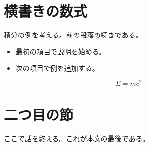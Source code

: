 \documentclass[a5paper]{ltjsarticle}
\begin{document}
\section{横書きの数式}
積分の例を考える。前の段落の続きである。

\begin{itemize}
\item 最初の項目で説明を始める。
\item 次の項目で例を追加する。
\end{itemize}

\[
  E = m c^2
\]

\section{二つ目の節}
ここで話を終える。これが本文の最後である。
\end{document}
